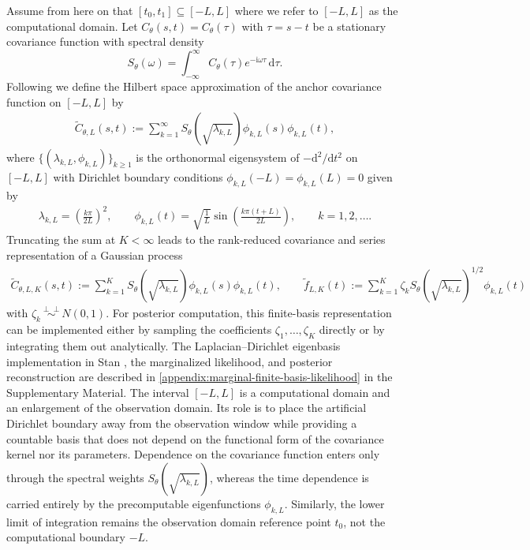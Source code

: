 \documentclass[11pt,a4paper]{article}
\theoremstyle{definition}
\theoremstyle{remark}
\newcommand{\indep}{\perp\!\!\!\perp}
\begin{document}
Assume from here on that $[t_0,t_1]\subseteq[-L,L]$ where we refer to $[-L,L]$ as the computational domain. Let $C_\theta(s,t)=C_\theta(\tau)$ with $\tau=s-t$ be a stationary covariance function with spectral density
\[
S_\theta(\omega)=\int_{-\infty}^{\infty} C_\theta(\tau)e^{-\mathrm{i}\omega\tau}\,\mathrm{d}\tau.
\]
Following \citet{solin2020hilbert} we define the Hilbert space approximation of the anchor covariance function on $[-L,L]$ by
\begin{align*}
\widetilde{C}_{\theta,L}(s,t) := \sum_{k=1}^\infty S_\theta\left(\sqrt{\lambda_{k,L}}\right)\phi_{k,L}(s)\phi_{k,L}(t),
\end{align*}
where $\{(\lambda_{k,L}, \phi_{k,L})\}_{k \geq 1}$ is the orthonormal eigensystem of $-\mathrm d^2/\mathrm dt^2$ on $[-L,L]$ with Dirichlet boundary conditions $\phi_{k,L}(-L) = \phi_{k,L}(L) = 0$ given by
\begin{align*}
\lambda_{k,L} = \left(\frac{k\pi}{2L}\right)^2, \qquad
\phi_{k,L}(t) = \sqrt{\frac{1}{L}} \sin\left(\frac{k\pi (t + L)}{2L}\right),
\qquad k=1,2,\ldots.
\end{align*}
Truncating the sum at $K < \infty$ leads to the rank-reduced covariance and series representation of a Gaussian process
\begin{align*}
\widetilde{C}_{\theta,L,K}(s,t)
:=
\sum_{k=1}^K
S_\theta\left(\sqrt{\lambda_{k,L}}\right)\phi_{k,L}(s)\phi_{k,L}(t), \qquad \widetilde{f}_{L,K}(t) := \sum_{k=1}^K \zeta_k S_\theta\left(\sqrt{\lambda_{k,L}}\right)^{1/2}\phi_{k,L}(t)
\end{align*}
with $\zeta_k \overset{\indep}{\sim} N(0,1)$. For posterior computation, this finite-basis representation can be implemented either by sampling the coefficients \(\zeta_1,\ldots,\zeta_K\) directly or by integrating them out analytically. The Laplacian--Dirichlet eigenbasis implementation in Stan \citep{stan2026}, the marginalized likelihood, and posterior reconstruction are described in \cref{appendix:marginal-finite-basis-likelihood} in the Supplementary Material. The interval \([-L,L]\) is a computational domain and an enlargement of the observation domain. Its role is to place the artificial Dirichlet boundary away from the observation window while providing a countable basis that does not depend on the functional form of the covariance kernel nor its parameters. Dependence on the covariance function enters only through the spectral weights \(S_\theta(\sqrt{\lambda_{k,L}})\), whereas the time dependence is carried entirely by the precomputable eigenfunctions \(\phi_{k,L}\). Similarly, the lower limit of integration remains the observation domain reference point \(t_0\), not the computational boundary \(-L\).
\end{document}

